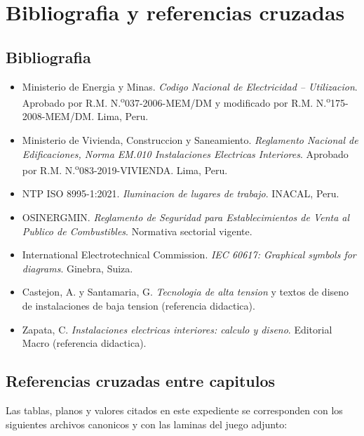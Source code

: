 \chapter{Bibliografia y referencias cruzadas}

\section{Bibliografia}

\begin{itemize}
\item Ministerio de Energia y Minas. \textit{Codigo Nacional de Electricidad --
      Utilizacion}. Aprobado por R.M. N.\textsuperscript{o}037-2006-MEM/DM y
      modificado por R.M. N.\textsuperscript{o}175-2008-MEM/DM. Lima, Peru.
\item Ministerio de Vivienda, Construccion y Saneamiento. \textit{Reglamento
      Nacional de Edificaciones, Norma EM.010 Instalaciones Electricas
      Interiores}. Aprobado por R.M. N.\textsuperscript{o}083-2019-VIVIENDA.
      Lima, Peru.
\item NTP ISO 8995-1:2021. \textit{Iluminacion de lugares de trabajo}.
      INACAL, Peru.
\item OSINERGMIN. \textit{Reglamento de Seguridad para Establecimientos de
      Venta al Publico de Combustibles}. Normativa sectorial vigente.
\item International Electrotechnical Commission. \textit{IEC 60617: Graphical
      symbols for diagrams}. Ginebra, Suiza.
\item Castejon, A. y Santamaria, G. \textit{Tecnologia de alta tension} y
      textos de diseno de instalaciones de baja tension (referencia didactica).
\item Zapata, C. \textit{Instalaciones electricas interiores: calculo y
      diseno}. Editorial Macro (referencia didactica).
\end{itemize}

\section{Referencias cruzadas entre capitulos}

Las tablas, planos y valores citados en este expediente se corresponden con los
siguientes archivos canonicos y con las laminas del juego adjunto:


